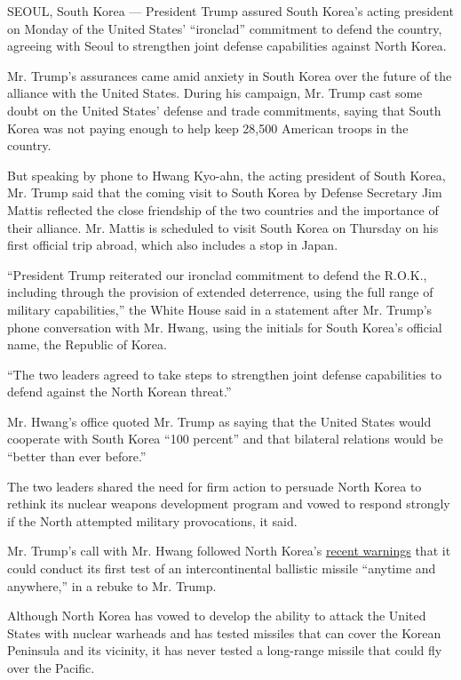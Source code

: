 SEOUL, South Korea --- President Trump assured South Korea's acting
president on Monday of the United States' ``ironclad'' commitment to
defend the country, agreeing with Seoul to strengthen joint defense
capabilities against North Korea.

Mr. Trump's assurances came amid anxiety in South Korea over the future
of the alliance with the United States. During his campaign, Mr. Trump
cast some doubt on the United States' defense and trade commitments,
saying that South Korea was not paying enough to help keep 28,500
American troops in the country.

But speaking by phone to Hwang Kyo-ahn, the acting president of South
Korea, Mr. Trump said that the coming visit to South Korea by Defense
Secretary Jim Mattis reflected the close friendship of the two countries
and the importance of their alliance. Mr. Mattis is scheduled to visit
South Korea on Thursday on his first official trip abroad, which also
includes a stop in Japan.

``President Trump reiterated our ironclad commitment to defend the
R.O.K., including through the provision of extended deterrence, using
the full range of military capabilities,'' the White House said in a
statement after Mr. Trump's phone conversation with Mr. Hwang, using the
initials for South Korea's official name, the Republic of Korea.

``The two leaders agreed to take steps to strengthen joint defense
capabilities to defend against the North Korean threat.''

Mr. Hwang's office quoted Mr. Trump as saying that the United States
would cooperate with South Korea ``100 percent'' and that bilateral
relations would be ``better than ever before.''

The two leaders shared the need for firm action to persuade North Korea
to rethink its nuclear weapons development program and vowed to respond
strongly if the North attempted military provocations, it said.

Mr. Trump's call with Mr. Hwang followed North Korea's
\href{https://www.nytimes3xbfgragh.onion/2017/01/09/world/asia/north-korea-trump-icbm-test.html?_r=0}{recent
warnings} that it could conduct its first test of an intercontinental
ballistic missile ``anytime and anywhere,'' in a rebuke to Mr. Trump.

Although North Korea has vowed to develop the ability to attack the
United States with nuclear warheads and has tested missiles that can
cover the Korean Peninsula and its vicinity, it has never tested a
long-range missile that could fly over the Pacific.

